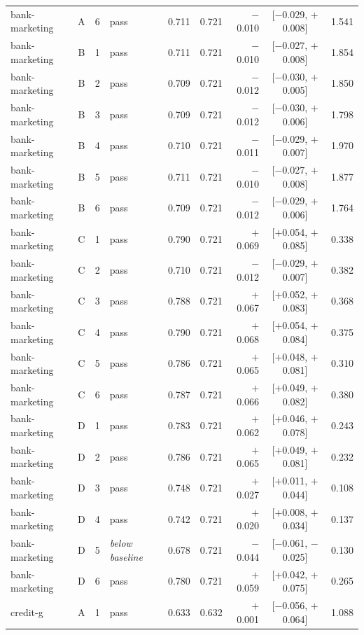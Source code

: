 {\begin{longtable}{lccl rrrcr}
bank-marketing & A & 6 & pass & 0.711 & 0.721 & $-$0.010 & [$-$0.029, $+$0.008] & 1.541 \\
\addlinespace[2pt]
bank-marketing & B & 1 & pass & 0.711 & 0.721 & $-$0.010 & [$-$0.027, $+$0.008] & 1.854 \\
bank-marketing & B & 2 & pass & 0.709 & 0.721 & $-$0.012 & [$-$0.030, $+$0.005] & 1.850 \\
bank-marketing & B & 3 & pass & 0.709 & 0.721 & $-$0.012 & [$-$0.030, $+$0.006] & 1.798 \\
bank-marketing & B & 4 & pass & 0.710 & 0.721 & $-$0.011 & [$-$0.029, $+$0.007] & 1.970 \\
bank-marketing & B & 5 & pass & 0.711 & 0.721 & $-$0.010 & [$-$0.027, $+$0.008] & 1.877 \\
bank-marketing & B & 6 & pass & 0.709 & 0.721 & $-$0.012 & [$-$0.029, $+$0.006] & 1.764 \\
\addlinespace[2pt]
bank-marketing & C & 1 & pass & 0.790 & 0.721 & $+$0.069 & [$+$0.054, $+$0.085] & 0.338 \\
bank-marketing & C & 2 & pass & 0.710 & 0.721 & $-$0.012 & [$-$0.029, $+$0.007] & 0.382 \\
bank-marketing & C & 3 & pass & 0.788 & 0.721 & $+$0.067 & [$+$0.052, $+$0.083] & 0.368 \\
bank-marketing & C & 4 & pass & 0.790 & 0.721 & $+$0.068 & [$+$0.054, $+$0.084] & 0.375 \\
bank-marketing & C & 5 & pass & 0.786 & 0.721 & $+$0.065 & [$+$0.048, $+$0.081] & 0.310 \\
bank-marketing & C & 6 & pass & 0.787 & 0.721 & $+$0.066 & [$+$0.049, $+$0.082] & 0.380 \\
\addlinespace[2pt]
bank-marketing & D & 1 & pass & 0.783 & 0.721 & $+$0.062 & [$+$0.046, $+$0.078] & 0.243 \\
bank-marketing & D & 2 & pass & 0.786 & 0.721 & $+$0.065 & [$+$0.049, $+$0.081] & 0.232 \\
bank-marketing & D & 3 & pass & 0.748 & 0.721 & $+$0.027 & [$+$0.011, $+$0.044] & 0.108 \\
bank-marketing & D & 4 & pass & 0.742 & 0.721 & $+$0.020 & [$+$0.008, $+$0.034] & 0.137 \\
bank-marketing & D & 5 & \emph{below baseline} & 0.678 & 0.721 & $-$0.044 & [$-$0.061, $-$0.025] & 0.130 \\
bank-marketing & D & 6 & pass & 0.780 & 0.721 & $+$0.059 & [$+$0.042, $+$0.075] & 0.265 \\
\midrule
credit-g & A & 1 & pass & 0.633 & 0.632 & $+$0.001 & [$-$0.056, $+$0.064] & 1.088 \\

\end{longtable}}
